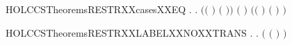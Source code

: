 \begin{SaveVerbatim}{HOLCCSTheoremsRESTRXXcasesXXEQ}
\HOLTokenTurnstile{} \HOLSymConst{\HOLTokenForall{}}   .
          \HOLTokenTransBegin{}\HOLTokenTransEnd {} \HOLSymConst{\HOLTokenEquiv{}}
       \HOLSymConst{\HOLTokenExists{}}   .
           \ensuremath{(}\ensuremath{(} \HOLSymConst{\ensuremath{=}} \ensuremath{)} \HOLSymConst{\HOLTokenConj{}} \ensuremath{(} \HOLSymConst{\ensuremath{=}} \ensuremath{)}\ensuremath{)} \HOLSymConst{\HOLTokenConj{}} \ensuremath{(} \HOLSymConst{\ensuremath{=}}   \ensuremath{)} \HOLSymConst{\HOLTokenConj{}}  \HOLTokenTransBegin{}\HOLTokenTransEnd {} \HOLSymConst{\HOLTokenConj{}}
           \ensuremath{(}\ensuremath{(} \HOLSymConst{\ensuremath{=}} \HOLConst{\ensuremath{\tau}}\ensuremath{)} \HOLSymConst{\HOLTokenDisj{}} \ensuremath{(} \HOLSymConst{\ensuremath{=}}  \ensuremath{)} \HOLSymConst{\HOLTokenConj{}}  \HOLConst{\HOLTokenNotIn{}}  \HOLSymConst{\HOLTokenConj{}}   \HOLConst{\HOLTokenNotIn{}} \ensuremath{)}
\end{SaveVerbatim}
\newcommand{\HOLCCSTheoremsRESTRXXcasesXXEQ}{\UseVerbatim{HOLCCSTheoremsRESTRXXcasesXXEQ}}
\begin{SaveVerbatim}{HOLCCSTheoremsRESTRXXLABELXXNOXXTRANS}
\HOLTokenTurnstile{} \HOLSymConst{\HOLTokenForall{}} .
        \HOLConst{\HOLTokenIn{}}  \HOLSymConst{\HOLTokenDisj{}}   \HOLConst{\HOLTokenIn{}}  \HOLSymConst{\HOLTokenImp{}} \HOLSymConst{\HOLTokenForall{}}  . \HOLSymConst{\HOLTokenNeg{}}\ensuremath{(}  \ensuremath{(} \HOLSymConst{\ensuremath{\ldotp}}\ensuremath{)} \HOLTokenTransBegin{}\HOLTokenTransEnd {}\ensuremath{)}
\end{SaveVerbatim}
\newcommand{\HOLCCSTheoremsRESTRXXLABELXXNOXXTRANS}{\UseVerbatim{HOLCCSTheoremsRESTRXXLABELXXNOXXTRANS}}
